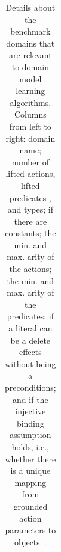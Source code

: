 \begin{table}[ht]
{\begin{tabular}{|l|c|c|c|c|c|c|c|c|c|c|}
    \end{tabular}
    }
    \caption{\small{Details about the benchmark domains that are relevant to domain model learning algorithms. Columns from left to right: domain name; number of lifted actions, lifted predicates , and types; if there are constants; the min. and max. arity of the actions; the min. and max. arity of the predicates; if a literal can be a delete effects without being a preconditions; and if the 
    injective binding assumption holds, i.e., whether there is a unique mapping from grounded action parameters to objects~\citep{juba2021safe}.}}    
    \label{tab:domains}
\end{table}